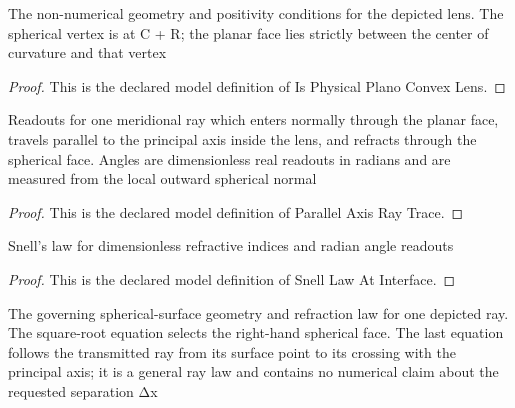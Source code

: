 \begin{definition}
  \label{def:physics:phyx-mini-0028:phyxminiproblems-problemphyxmini0028-isphysicalplanoconvexlens}
  The non-numerical geometry and positivity conditions for the depicted lens. The spherical vertex is at C + R; the planar face lies strictly between the center of curvature and that vertex
\end{definition}
\begin{proof}
  This is the declared model definition of Is Physical Plano Convex Lens.
\end{proof}
\begin{definition}
  \label{def:physics:phyx-mini-0028:phyxminiproblems-problemphyxmini0028-parallelaxisraytrace}
  Readouts for one meridional ray which enters normally through the planar face, travels parallel to the principal axis inside the lens, and refracts through the spherical face. Angles are dimensionless real readouts in radians and are measured from the local outward spherical normal
\end{definition}
\begin{proof}
  This is the declared model definition of Parallel Axis Ray Trace.
\end{proof}
\begin{definition}
  \label{def:physics:phyx-mini-0028:phyxminiproblems-problemphyxmini0028-snelllawatinterface}
  Snell's law for dimensionless refractive indices and radian angle readouts
\end{definition}
\begin{proof}
  This is the declared model definition of Snell Law At Interface.
\end{proof}
\begin{definition}
  \label{def:physics:phyx-mini-0028:phyxminiproblems-problemphyxmini0028-satisfiessphericalexitraylaw}
  The governing spherical-surface geometry and refraction law for one depicted ray. The square-root equation selects the right-hand spherical face. The last equation follows the transmitted ray from its surface point to its crossing with the principal axis; it is a general ray law and contains no numerical claim about the requested separation Δx
\end{definition}

